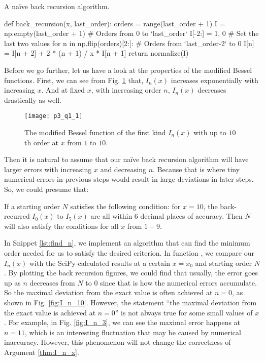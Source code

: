 \begin{algorithm}
    \caption{A naïve back recursion algorithm.}
    \label{lst:back_recursion}
    \begin{pythoncode}
        def back_recursion(x, last_order):
            orders = range(last_order + 1)
            I = np.empty(last_order + 1)  # Orders from 0 to `last_order`
            I[-2:] = 1, 0  # Set the last two values
            for n in np.flip(orders)[2:]:  # Orders from `last_order-2` to 0
                I[n] = I[n + 2] + 2 * (n + 1) / x * I[n + 1]
            return normalize(I)
    \end{pythoncode}
\end{algorithm}

Before we go further, let us have a look at the properties of the modified Bessel
functions. First, we can see from Fig. \ref{fig:bessel} that,
$I_n(x)$ increases exponentially with increasing $x$.
And at fixed $x$, with increasing order $n$, $I_n(x)$ decreases drastically as well.

\begin{figure}[H]
    \centering
    \texttt{[image: p3\_q1\_1]}
    \caption{The modified Bessel function of the first kind $I_n(x)$ with
        up to $10$th order at $x$ from $1$ to $10$.}
    \label{fig:bessel}
\end{figure}

Then it is natural to assume that our naïve back recursion algorithm will have larger
errors with increasing $x$ and decreasing $n$. Because that is where tiny numerical
errors in previous steps would result in large deviations in later steps.
So, we could presume that:
\begin{theorem}\label{thm:I_n_x}
    If a starting order $N$ satisfies the following condition:
    for $x = 10$, the back-recurred $I_0(x)$ to $I_5(x)$ are all within $6$ decimal
    places of accuracy. Then $N$ will also satisfy the conditions for all $x$ from $1 - 9$.
\end{theorem}

In Snippet \ref{lst:find_n}, we implement an algorithm that can find the minimum order
needed for us to satisfy the desired criterion. In function , we compare
our $I_n(x)$ with the SciPy-calculated results at a certain $x = x_0$ and starting order $N$.
By plotting the back recursion figures, we could find that usually, the error goes up
as $n$ decreases from $N$ to $0$ since that is how the numerical errors accumulate.
So the maximal deviation from the exact value is often achieved at $n = 0$, as shown in
Fig. \ref{fig:I_n_10}. However, the statement ``the maximal deviation from the exact value
is achieved at $n = 0$'' is not always true for some small values of $x$. For example,
in Fig. \ref{fig:I_n_3}, we can see the maximal error happens at $n = 11$, which is an
interesting fluctuation that may be caused by numerical inaccuracy. However, this phenomenon
will not change the correctness of Argument \ref{thm:I_n_x}.

